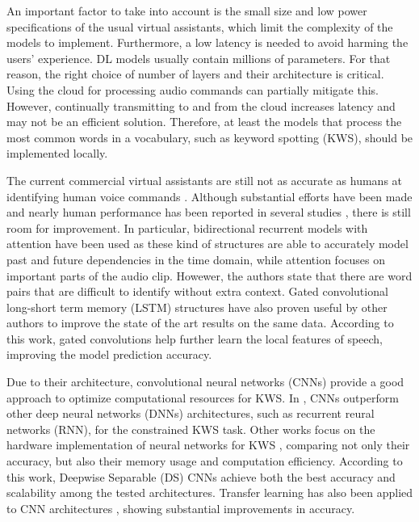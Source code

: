 An important factor to take into account is the small size and low power specifications of the usual virtual assistants, which limit the complexity of the models to implement. Furthermore, a low latency is needed to avoid harming the users' experience. DL models usually contain millions of parameters. For that reason, the right choice of number of layers and their architecture is critical. Using the cloud for processing audio commands can partially mitigate this. However, continually transmitting to and from the cloud increases latency and may not be an efficient solution. Therefore, at least the models that process the most common words in a vocabulary, such as keyword spotting (KWS), should be implemented locally.

The current commercial virtual assistants are still not as accurate as humans at identifying human voice commands \autocite{Michaely2017}. Although substantial efforts have been made and nearly human performance has been reported in several studies \autocite{Andrade2018, Zhang2017, Mcmahan2017, Warden2018}, there is still room for improvement. In particular, bidirectional recurrent models with attention have been used  \autocite{Andrade2018} as these kind of structures are able to accurately model past and future dependencies in the time domain, while attention focuses on important parts of the audio clip. Howewer, the authors state that there are word pairs that are difficult to identify without extra context. Gated convolutional long-short term memory (LSTM) structures have also proven useful by other authors \autocite{Wang2018} to improve the state of the art results on the same data. According to this work, gated convolutions help further learn the local features of speech, improving the model prediction accuracy.

Due to their architecture, convolutional neural networks (CNNs) provide a good approach to optimize computational resources for KWS. In \autocite{Tara2015}, CNNs outperform other deep neural networks (DNNs) architectures, such as recurrent reural networks (RNN), for the constrained KWS task. Other works focus on the hardware implementation of neural networks for KWS \autocite{Zhang2017}, comparing not only their accuracy, but also their memory usage and computation efficiency. According to this work, Deepwise Separable (DS) CNNs achieve both the best accuracy and scalability among the tested architectures.  Transfer learning has also been applied to CNN architectures \autocite{Mcmahan2017}, showing substantial improvements in accuracy.

